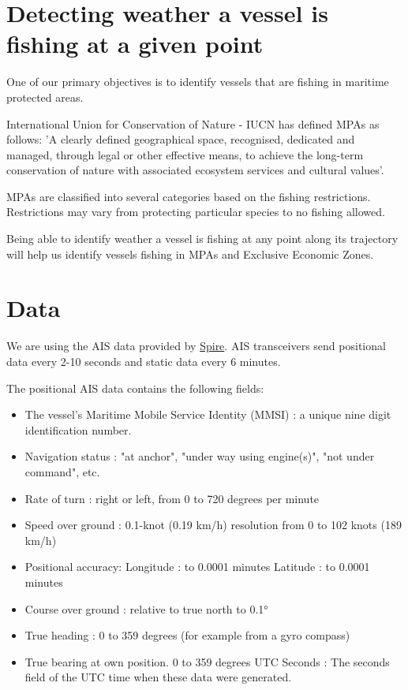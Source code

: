 \section{Detecting weather a vessel is fishing at a given point}
One of our primary objectives is to identify vessels that are fishing in maritime protected areas.

International Union for Conservation of Nature - IUCN has defined MPAs as follows:
'A clearly defined geographical space, recognised, dedicated and managed, through legal or other effective means, to achieve the long-term conservation of nature with associated ecosystem services and cultural values'.

MPAs are classified into several categories based on the fishing restrictions. Restrictions may vary from protecting particular species to no fishing allowed.

Being able to identify weather a vessel is fishing at any point along its trajectory will help us identify vessels fishing in MPAs and Exclusive Economic Zones.

\section{Data}

We are using the AIS data provided by \href{https://spire.com/}{Spire}.
AIS transceivers send positional data every 2-10 seconds and static data every 6 minutes.

The positional AIS data contains the following fields:
\begin{itemize}
\item The vessel's Maritime Mobile Service Identity (MMSI) : a unique nine digit identification number.
\item Navigation status : "at anchor", "under way using engine(s)", "not under command", etc.
\item Rate of turn : right or left, from 0 to 720 degrees per minute
\item Speed over ground : 0.1-knot (0.19 km/h) resolution from 0 to 102 knots (189 km/h)
\item Positional accuracy:
Longitude : to 0.0001 minutes
Latitude : to 0.0001 minutes
\item Course over ground : relative to true north to 0.1°
\item True heading : 0 to 359 degrees (for example from a gyro compass)
\item True bearing at own position. 0 to 359 degrees
UTC Seconds : The seconds field of the UTC time when these data were generated.
\end{itemize}

